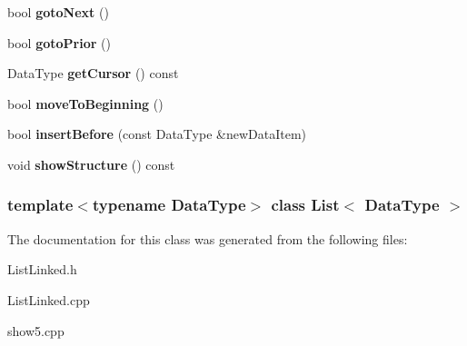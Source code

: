 \begin{DoxyCompactItemize}
\item 
\hypertarget{class_list_a5af0150379871c250be465023651c192}{bool {\bfseries goto\-Next} ()}\label{class_list_a5af0150379871c250be465023651c192}

\item 
\hypertarget{class_list_a68070047cb87d5a8a79b6593423bb6c8}{bool {\bfseries goto\-Prior} ()}\label{class_list_a68070047cb87d5a8a79b6593423bb6c8}

\item 
\hypertarget{class_list_a62ecc688a908bebeb8d6995a8e7d3af7}{\-Data\-Type {\bfseries get\-Cursor} () const }\label{class_list_a62ecc688a908bebeb8d6995a8e7d3af7}

\item 
\hypertarget{class_list_a5352e772360e9c8b4bc4b12253f40ff5}{bool {\bfseries move\-To\-Beginning} ()}\label{class_list_a5352e772360e9c8b4bc4b12253f40ff5}

\item 
\hypertarget{class_list_a77d7a91de04c14c0b481d052d96ac1aa}{bool {\bfseries insert\-Before} (const \-Data\-Type \&new\-Data\-Item)}\label{class_list_a77d7a91de04c14c0b481d052d96ac1aa}

\item 
\hypertarget{class_list_a21096bf301917ea368456ceda68dc006}{void {\bfseries show\-Structure} () const }\label{class_list_a21096bf301917ea368456ceda68dc006}

\end{DoxyCompactItemize}
\subsubsection*{template$<$typename Data\-Type$>$ class List$<$ Data\-Type $>$}



\-The documentation for this class was generated from the following files\-:\begin{DoxyCompactItemize}
\item 
\-List\-Linked.\-h\item 
\-List\-Linked.\-cpp\item 
show5.\-cpp\end{DoxyCompactItemize}
